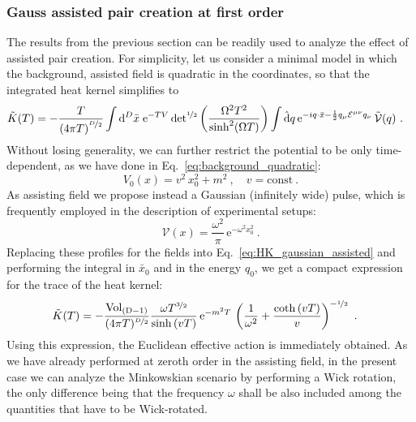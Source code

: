 \documentclass[12pt,a4paper]{article}
\numberwithin{equation}{section}
\numberwithin{equation}{section}
\begin{document}
\subsubsection{Gauss assisted pair creation at first order}\label{sec:assisted}
The results from the previous section can be readily used to analyze the effect of assisted pair creation. 
For simplicity, let us consider a minimal model in which the background, assisted field is quadratic in the coordinates, so that the integrated heat kernel simplifies to
\begin{align}\label{eq:HK_gaussian_assisted}
\begin{split} 
\tilde{K}(T)&=-\frac{T}{\left( 4\pi T \right)^{\nicefrac{D}{2}}} \int {\rm d}^D\bar{x} \; \mathrm{e}^{-TV} \, \mathrm{det}^{\nicefrac{1}{2}}\left( \frac{\Omega^2T^2}{\sinh^2(\Omega T)} \right)
\int \hat{\rm d}q\,\mathrm{e}^{-i q \cdot \bar{x}-\frac12 q_\mu \mathcal{E}^{\mu\nu}q_\nu} \, \tilde{\mathcal{V}}(q) \ .
\end{split}
\end{align}
Without losing generality, we can further restrict the potential to be only time-dependent, as we have done in Eq.~\eqref{eq:background_quadratic}:
\begin{equation}
 V_0(x)=v^2 \, x_0^2+m^2\ , \quad v=\text{const}\ .
\end{equation}
As assisting field we propose instead a Gaussian (infinitely wide) pulse, which is frequently employed in the description of experimental setups: 
\begin{equation}
 \mathcal{V}(x)=\frac{\omega^2}{\pi} \, \mathrm{e}^{-\omega^2 x_0^2}\ .
\end{equation}
Replacing these profiles for the fields into Eq.~\eqref{eq:HK_gaussian_assisted} and performing the integral in $\bar{x}_0$ and in the energy $q_0$, we get a compact expression for the trace of the heat kernel:
\begin{align}
\begin{split}
 \tilde{K}(T)
 &=-\frac{\mathrm{Vol}_{\mathrm{(D-1)}} }{(4\pi T)^{\nicefrac{D}{2}}} \frac{ \omega T^{\nicefrac{3}{2}} }{\sinh{\left( vT \right)}} \, \mathrm{e}^{-m^2T}\,\left( \frac{1}{\omega^2}+\frac{\coth{(vT)}}{v} \right)^{-\nicefrac{1}{2}}\ .
\end{split}
\end{align}
Using this expression, the Euclidean effective action is immediately obtained. As we have already performed at zeroth order in the assisting field, in the present case we can analyze the Minkowskian scenario by performing a Wick rotation, the only difference being that the frequency $\omega$ shall be also included among the quantities that have to be Wick-rotated. 
\end{document}
